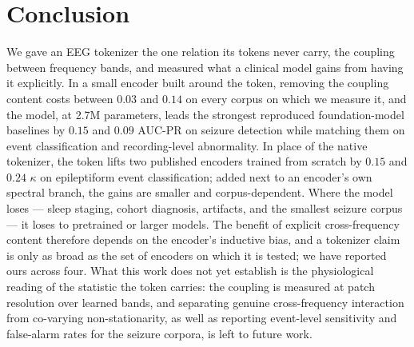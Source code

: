 \section{Conclusion}
\label{sec:conclusion}

We gave an EEG tokenizer the one relation its tokens never carry, the
coupling between frequency bands, and measured what a clinical model
gains from having it explicitly. In a small encoder built around the
token, removing the coupling content costs between $0.03$ and $0.14$ on
every corpus on which we measure it, and the model, at 2.7M parameters,
leads the strongest reproduced foundation-model baselines by $0.15$ and
$0.09$ AUC-PR on seizure detection while matching them on event
classification and recording-level abnormality. In place of the native
tokenizer, the token lifts two published encoders trained from scratch
by $0.15$ and $0.24$ $\kappa$ on epileptiform event classification; added
next to an encoder's own spectral branch, the gains are smaller and
corpus-dependent. Where the model loses --- sleep staging, cohort
diagnosis, artifacts, and the smallest seizure corpus --- it loses to
pretrained or larger models. The benefit of explicit cross-frequency
content therefore depends on the encoder's inductive bias, and a
tokenizer claim is only as broad as the set of encoders on which it is
tested; we have reported ours across four. What this work does not yet
establish is the physiological reading of the statistic the token
carries: the coupling is measured at patch resolution over learned bands,
and separating genuine cross-frequency interaction from co-varying
non-stationarity, as well as reporting event-level sensitivity and
false-alarm rates for the seizure corpora, is left to future work.
